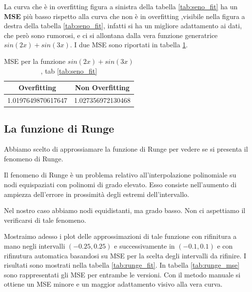 \documentclass[../main.tex]{subfiles}
\begin{document}
\begin{remark}
    La curva che è in overfitting  figura a sinistra della tabella \ref{tab:seno_fit} ha un \textbf{MSE} più basso rispetto 
    alla curva che non è in overfitting ,visibile nella figura a destra della tabella \ref{tab:seno_fit}, 
    infatti si ha un migliore adattamento ai dati, 
    che però sono rumorosi, e ci si allontana dalla vera funzione generatrice $sin(2x) + sin(3x)$. 
    I due MSE sono riportati in tabella \ref{tab:seno_mse}.

    \begin{table}[h!]
        \centering
        \caption{MSE per la funzione $sin(2x) + sin(3x)$, tab \ref{tab:seno_fit}}\label{tab:seno_mse}
         \begin{tabular}{||c c ||} 
         \hline
         Overfitting & Non Overfitting \\ [0.5ex] 
         \hline\hline
         1.0197649870617647 & 1.027356972130468 \\  [1ex] 
         \hline
         \end{tabular}
        \end{table}
\end{remark}

\subsection{La funzione di Runge}
Abbiamo scelto di approssiamare la funzione di Runge per vedere se si presenta il fenomeno di Runge.
\begin{definition}
    Il fenomeno di Runge è un problema relativo all'interpolazione polinomiale su nodi equispaziati con polinomi di grado elevato. 
    Esso consiste nell'aumento di ampiezza dell'errore in prossimità degli estremi dell'intervallo.
\end{definition}
Nel nostro caso abbiamo nodi equidistanti, ma grado basso. Non ci aspettiamo il verificarsi di tale fenomeno.

Mostraimo adesso i plot delle approssimazioni di tale funzione con rifinitura a mano negli intervalli $(-0.25,0.25)$ e successivamente 
in $(-0.1,0.1)$ e con rifinutura automatica basandosi su MSE per la scelta degli intervalli da rifinire. I risultati sono mostrati nella 
tabella \ref{tab:runge_fit}.
In tabella \ref{tab:runge_mse} sono rappresentati gli MSE per entrambe le versioni. Con il metodo manuale si ottiene un MSE minore 
e un maggior adattamento visivo alla vera curva.
\end{document}
